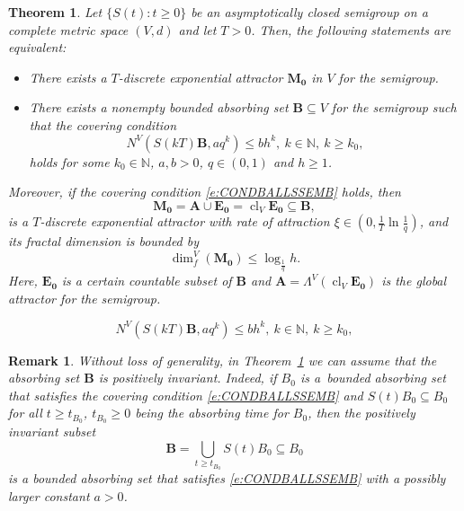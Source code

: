\documentclass[10pt,a4paper]{amsart}
\newtheorem{thm}{Theorem}
\newtheorem{rem}{Remark}
\newcommand{\N}{\mathbb{N}}
\newcommand{\cl}{\operatorname{cl}}
\newcommand{\dimf}{\operatorname{dim}_{f}}
\renewcommand{\geq}{\geqslant}
\renewcommand{\leq}{\leqslant}
\begin{document}
\begin{thm}\label{thm:EXDEXPAT}
Let $\{S(t)\colon t\geq 0\}$ be an asymptotically closed semigroup on a complete metric space $(V,d)$ and let $T>0$.
Then, the following statements are equivalent:
\begin{itemize}
\item[$(1)$] There exists a $T$-discrete exponential attractor $\mathbf{M_0}$ in $V$ for the semigroup.
\item[$(2)$] There exists a nonempty bounded 
absorbing set $\mathbf{B}\subseteq V$ for the semigroup
such that the covering condition 
\begin{equation}\label{e:CONDBALLSSEMB}
N^{V}(S(kT)\mathbf{B},aq^{k})\leq b h^{k},\ k\in\N,\ k\geq k_0,
\end{equation}
holds for some $k_0\in\N$, $a,b>0$, $q\in(0,1)$ and $h\geq 1$. 
\end{itemize}
Moreover, if the covering condition \eqref{e:CONDBALLSSEMB} holds, then
$$\mathbf{M_0}=\mathbf{A}\cup\mathbf{E_0}=\cl_{V}\mathbf{E_0}\subseteq \mathbf{B},$$
is a $T$-discrete exponential attractor with rate of attraction
$\xi\in(0,\frac{1}{T}\ln{\frac{1}{q}})$, and its fractal dimension is bounded by
\begin{equation}\label{e:ESTDIMM3}
\dimf^{V}(\mathbf{M_0})\leq\log_{\frac{1}{q}}h.
\end{equation}
Here, $\mathbf{E_0}$ is a certain countable subset of $\mathbf{B}$ and $\mathbf{A}=\Lambda^{V}(\cl_{V}\mathbf{E_0})$ is the global attractor for the semigroup.
\end{thm}

\begin{equation}
N^{V}(S(kT)\mathbf{B},aq^{k})\leq b h^{k},\ k\in\N,\ k\geq k_0,
\end{equation}

\begin{rem}\label{rem:POSINV}
Without loss of generality, in Theorem~\ref{thm:EXDEXPAT} we can assume that the absorbing set $\mathbf{B}$ is \emph{positively invariant}.
Indeed, if $B_0$ is a~bounded absorbing set that satisfies the covering condition \eqref{e:CONDBALLSSEMB} 
and $S(t)B_0\subseteq B_0$ for all $t\geq t_{B_0}$, $t_{B_0}\geq0$ being the absorbing time for $B_0$, then the positively invariant subset
\begin{equation*}
\mathbf{B}=\bigcup_{t\geq t_{B_0}}S(t)B_0\subseteq B_0
\end{equation*}
is a bounded absorbing set that satisfies \eqref{e:CONDBALLSSEMB} with a possibly  larger constant $a>0$.
\end{rem}
\end{document}
